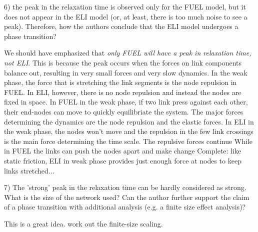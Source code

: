 \documentclass[11pt]{article}
\newcommand{\outNim}[1]{}
\begin{document}
\begin{response}{
6) the peak in the relaxation time is observed only for the FUEL model, but it does not appear in the ELI model (or, at least, there is too much noise to see a peak). 
Therefore, how the authors conclude that the ELI model undergoes a phase transition? 
}

We should have emphasized that {\em only FUEL will have a peak in relaxation time, not ELI}. 
This is because the peak occurs when the forces on link components balance out, resulting in very small forces and very slow dynamics. 
In the weak phase, the force that is stretching the link segments is the node repulsion in FUEL. 
In ELI, however, there is no node repulsion and instead the nodes are fixed in space. 
In FUEL in the weak phase, if two link press against each other, their end-nodes can move to quickly equilibriate the system. 
The major forces determining the dynamics are the node repulsion and the elastic forces. 
In ELI in the weak phase, the nodes won't move and the repulsion in the few link crossings is the main force determining the time scale. 
The repulsive forces continue 
While in FUEL the links can push the nodes apart and make change 
{\color{red} Complete: like static friction, ELI in weak phase provides just enough force at nodes to keep links stretched... }
\outNim{
As mentioned above in ``5)'', we have a ``transition region'' $\sim 10^{-1}<x<5$. 
This is also clear from the relaxation time plots Fig.2D, which show that the peak in relaxation time for FUEL extends from $x\sim 10^{-1}$ to $x\sim 5$.

ElI lacks such a peak (the reason discussed below), rather it shows a linear drop over the smae region $\sim 10^{-1}<x<5$ from a high and fairly constant relaxation time in the weak phase to a very small one in the strong phase. 
}

\end{response}
\begin{response}{
7) The 'strong' peak in the relaxation time can be hardly considered as strong. What is the size of the network used? Can the author further support the claim of a phase transition with additional analysis (e.g. a finite size effect analysis)?

}

This is a great idea. 
{\color{red} work out the finite-size scaling.}
\end{response}
\end{document}
